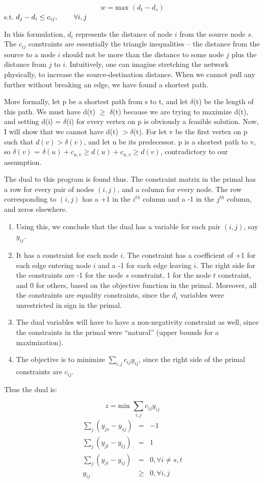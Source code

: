 \documentclass[11pt]{article}
\begin{document}
\begin{center}
\[w=\mbox{max }(d_t-d_s)\]
s.t. $d_j-d_i\leq c_{ij}, \hspace{0.3in} \forall i,j$
\end{center}

In this formulation, $d_i$ represents the distance of node $i$ from the source node $s$. The $c_{ij}$ constraints are essentially the triangle inequalities -- the distance from the source to a node $i$ should not be more than the distance to some node $j$ plus the distance from $j$ to $i$. Intuitively, one can imagine stretching the network physically, to increase the source-destination distance. When we cannot pull any further without breaking an edge, we have found a shortest path.

More formally, let p be a shortest path from s to t, and let $\delta$(t) be the length of this path. We must have d(t) $\geq$ $\delta$(t) because we are trying to maximize d(t), and setting d(i) = $\delta$(i) for every vertex on p is obviously a feasible solution. Now, I will show that we cannot have d(t) $> \delta$(t). For let v be the first vertex on p such that $d(v) > \delta(v)$, and let u be its predecessor. p is a shortest path to v, so $\delta(v)$ = $\delta(u) + c_{u,v} \geq d(u) + c_{u,v} \geq d(v)$, contradictory to our assumption.

The dual to this program is found thus. The constraint matrix in the primal has a row for every pair of nodes $(i,j)$, and a column for every node. The row corresponding to $(i,j)$ has a +1 in the $i^{th}$ column and a -1 in the $j^{th}$ column, and zeros elsewhere. 
\begin{enumerate}
\item Using this, we conclude that the dual has a variable for each pair $(i,j)$, say $y_{ij}$. 
\item It has a constraint for each node $i$. The constraint has a coefficient of +1 for each edge entering node $i$ and a -1 for each edge leaving $i$. The right side for the constraints are -1 for the node $s$ constraint, 1 for the node $t$ constraint, and 0 for others, based on the objective function in the primal. Moreover, all the constraints are equality constraints, since the $d_i$ variables were unrestricted in sign in the primal.
\item The dual variables will have to have a non-negativity constraint as well, since the constraints in the primal were ``natural'' (upper bounds for a maximization). 
\item The objective is to minimize $\sum_{i,j}c_{ij}y_{ij}$, since the right side of the primal constraints are $c_{ij}$.
\end{enumerate}
Thus the dual is:
\begin{center}
\[z=\mbox{min }\sum_{i,j}c_{ij}y_{ij}\]
\begin{eqnarray*}
\sum_j(y_{js}-y_{sj})&=&-1\\
\sum_j(y_{jt}-y_{tj})&=&1\\
\sum_j(y_{ji}-y_{ij})&=&0, \forall i \neq s,t\\
y_{ij}&\geq&0, \forall i,j
\end{eqnarray*}
\end{center}
\end{document}
